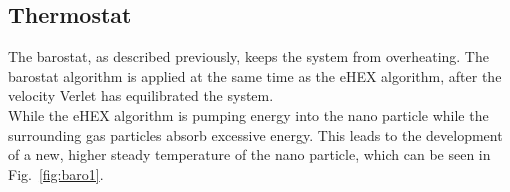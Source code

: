 \documentclass[12pt]{article}
\begin{document}
\subsection{Thermostat}
The barostat, as described previously, keeps the system from overheating. The barostat algorithm is applied at the same time as the eHEX algorithm,
after the velocity Verlet has equilibrated the system.\\
While the eHEX algorithm is pumping energy into the nano particle while the surrounding gas particles absorb excessive energy. This leads to the
development of a new, higher steady temperature of the nano particle, which can be seen in Fig.~\ref{fig:baro1}. 
\end{document}
